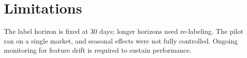 \section{Limitations}
The label horizon is fixed at 30 days; longer horizons need re-labeling. The pilot ran on a
single market, and seasonal effects were not fully controlled. Ongoing monitoring for
feature drift is required to sustain performance.
